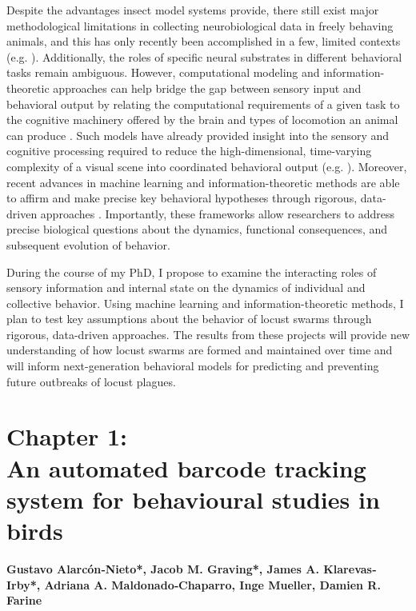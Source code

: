 \documentclass[11pt,a4paper,oneside]{article}
\begin{document}
	Despite the advantages insect model systems provide, there still exist major methodological limitations in collecting neurobiological data in freely behaving animals, and this has only recently been accomplished in a few, limited contexts (e.g. \citealp{martin2015central}). Additionally, the roles of specific neural substrates in different behavioral tasks remain ambiguous. However, computational modeling and information-theoretic approaches can help bridge the gap between sensory input and behavioral output by relating the computational requirements of a given task to the cognitive machinery offered by the brain and types of locomotion an animal can produce \citep{webb2016neural}. Such models have already provided insight into the sensory and cognitive processing required to reduce the high-dimensional, time-varying complexity of a visual scene into coordinated behavioral output (e.g. \citealp{bertrand2015bio,mischiati2015internal}). Moreover, recent advances in machine learning and information-theoretic methods are able to affirm and make precise key behavioral hypotheses through rigorous, data-driven approaches \citep{berman2014drosopholid,berman2014mapping,berman2016predictability,klibaite2017unsupervised,todd2017exploration,wiltschko2015,twomey2016vision}. Importantly, these frameworks allow researchers to address precise biological questions about the dynamics, functional consequences, and subsequent evolution of behavior. 
	\par
	During the course of my PhD, I propose to examine the interacting roles of sensory information and internal state on the dynamics of individual and collective behavior. Using machine learning and information-theoretic methods, I plan to test key assumptions about the behavior of locust swarms through rigorous, data-driven approaches. The results from these projects will provide new understanding of how locust swarms are formed and maintained over time and will inform next-generation behavioral models for predicting and preventing future outbreaks of locust plagues.

\newpage 
	\section[Chapter 1: An automated barcode tracking system]{\LARGE{Chapter 1:} \\ \Large{An automated barcode tracking system for behavioural studies in birds}}
	\vspace{5mm}
	\textbf{\normalsize Gustavo Alarcón‐Nieto*, Jacob M. Graving*, James A. Klarevas‐Irby*, Adriana A. Maldonado‐Chaparro, Inge Mueller, Damien R. Farine} \\
    \vspace{1mm}
\end{document}
